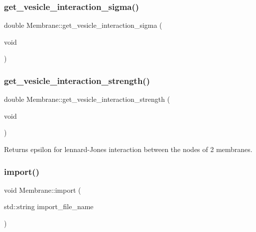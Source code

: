 \mbox{\label{classMembrane_a42b4b787240cc27329218909bf790409}} 
\subsubsection{\texorpdfstring{get\_vesicle\_interaction\_sigma()}{get\_vesicle\_interaction\_sigma()}}
{\footnotesize\ttfamily double Membrane\+::get\+\_\+vesicle\+\_\+interaction\+\_\+sigma (\begin{DoxyParamCaption}\item[{void}]{ }\end{DoxyParamCaption})\hspace{0.3cm}{\ttfamily [inline]}}

\mbox{\label{classMembrane_a77171793ae4115a603f57f3472868ff8}} 
\subsubsection{\texorpdfstring{get\_vesicle\_interaction\_strength()}{get\_vesicle\_interaction\_strength()}}
{\footnotesize\ttfamily double Membrane\+::get\+\_\+vesicle\+\_\+interaction\+\_\+strength (\begin{DoxyParamCaption}\item[{void}]{ }\end{DoxyParamCaption})\hspace{0.3cm}{\ttfamily [inline]}}

Returns epsilon for lennard-\/\+Jones interaction between the nodes of 2 membranes. \mbox{\label{classMembrane_ab235205040b763fa4c5045eddacf8034}} 
\subsubsection{\texorpdfstring{import()}{import()}}
{\footnotesize\ttfamily void Membrane\+::import (\begin{DoxyParamCaption}\item[{std\+::string}]{import\+\_\+file\+\_\+name }\end{DoxyParamCaption})}


